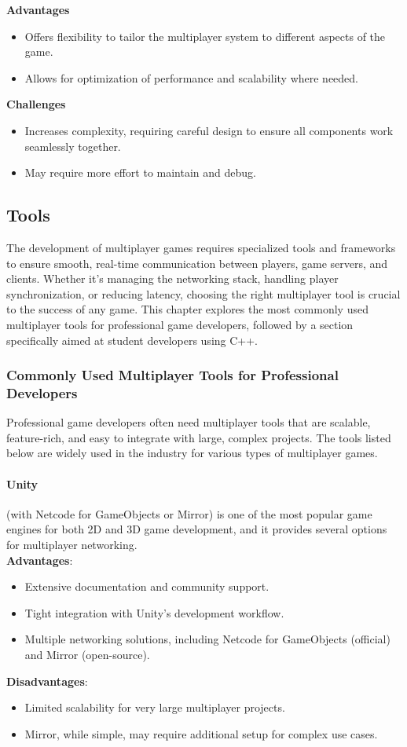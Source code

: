 \documentclass{article} %
\begin{document}
\textbf{Advantages}
\begin{itemize}
	\item Offers flexibility to tailor the multiplayer system to different aspects of the game.
	\item Allows for optimization of performance and scalability where needed.
\end{itemize}

\textbf{Challenges}
\begin{itemize}
	\item Increases complexity, requiring careful design to ensure all components work seamlessly together.
	\item May require more effort to maintain and debug.
\end{itemize}

\subsection{Tools}
The development of multiplayer games requires specialized tools and frameworks to ensure smooth,
real-time communication between players, game servers, and clients. Whether it's managing the networking stack, handling player synchronization, or reducing latency,
choosing the right multiplayer tool is crucial to the success of any game. This chapter explores the most commonly used multiplayer tools for professional game developers,
followed by a section specifically aimed at student developers using C++.

\subsubsection{Commonly Used Multiplayer Tools for Professional Developers}
Professional game developers often need multiplayer tools that are scalable, feature-rich, and easy to integrate with large, complex projects. The tools listed below are widely used in the industry for various types of multiplayer games.

\paragraph{Unity} (with Netcode for GameObjects or Mirror)
is one of the most popular game engines for both 2D and 3D game development,
and it provides several options for multiplayer networking.
\\
\textbf{Advantages}:
\begin{itemize}
	\item Extensive documentation and community support.
	\item Tight integration with Unity's development workflow.
	\item Multiple networking solutions, including Netcode for GameObjects (official) and Mirror (open-source).
\end{itemize}
\textbf{Disadvantages}:
\begin{itemize}
	\item Limited scalability for very large multiplayer projects.
	\item Mirror, while simple, may require additional setup for complex use cases.
\end{itemize}
\end{document}
